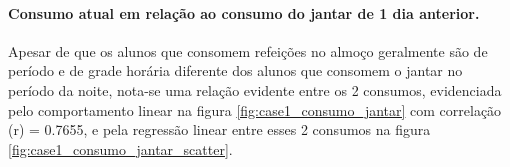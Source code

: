                 \paragraph{Consumo atual em relação ao consumo do jantar de 1 dia anterior.}
                
                    Apesar de que os alunos que consomem refeições no almoço geralmente são de período e  de grade horária diferente dos alunos que consomem o jantar no período da noite, nota-se uma relação evidente entre os 2 consumos, evidenciada pelo comportamento linear na figura \ref{fig:case1_consumo_jantar} com correlação (r) = 0.7655, e pela regressão linear entre esses 2 consumos na figura  \ref{fig:case1_consumo_jantar_scatter}.\newline
                    
                    {\begin{center} 
                    \begin{minipage}[c]{1.0\textwidth}
                    \begin{figure}[H]
                    \end{figure} 
                    \end{minipage}\hfill %
                    

\end{center}}

